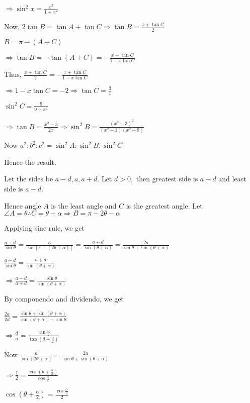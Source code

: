   $\Rightarrow \sin^2x = \frac{x^2}{1 + x^2}$

  Now, $2\tan B = \tan A + \tan C \Rightarrow \tan B = \frac{x + \tan C}{2}$

  $B = \pi - (A + C)$

  $\Rightarrow \tan B = -\tan(A + C) = -\frac{x + \tan C}{1 - x\tan C}$

  Thus, $\frac{x + \tan C}{2} = -\frac{x + \tan C}{1 - x\tan C}$

  $\Rightarrow 1 - x\tan C = -2 \Rightarrow \tan C = \frac{3}{x}$

  $\sin^2C = \frac{9}{9 + x^2}$

  $\Rightarrow \tan B = \frac{x^2 + 3}{2x} \Rightarrow \sin^2B = \frac{(x^2 + 3)^2}{(x^2 + 1)(x^2 + 9)}$

  Now $a^2:b^2:c^2 = \sin^2A:\sin^2B:\sin^2C$

  Hence the result.

\item Let the sides be $a - d, a, a + d.$ Let $d > 0,$ then greatest side is $a + d$ and least side is $a -
  d.$

  Hence angle $A$ is the least angle and $C$ is the greatest angle. Let $\angle A = \theta \therefore C =
  \theta + \alpha \Rightarrow B = \pi - 2\theta - \alpha$

  Applying sine rule, we get

  $\frac{a - d}{\sin\theta} = \frac{a}{\sin[\pi - (2\theta + \alpha)]} = \frac{a + d}{\sin(\theta + \alpha)} =
  \frac{2a}{\sin\theta + \sin(\theta + \alpha)}$

  $\frac{a - d}{\sin\theta} = \frac{a + d}{\sin(\theta + \alpha)}$

  $\Rightarrow \frac{a - d}{a + d} = \frac{\sin\theta}{\sin(\theta + \alpha)}$

  By componendo and dividendo, we get

  $\frac{2a}{2d} = \frac{\sin\theta + \sin(\theta + \alpha)}{\sin(\theta + \alpha) - \sin\theta}$

  $\Rightarrow \frac{d}{a} = \frac{\tan\frac{\alpha}{2}}{\tan\left(\theta + \frac{\alpha}{2}\right)}$

  Now $\frac{a}{\sin(2\theta + \alpha)} = \frac{2a}{\sin\theta + \sin(\theta + \alpha)}$

  $\Rightarrow \frac{1}{2} = \frac{\cos\left(\theta + \frac{\alpha}{2}\right)}{\cos\frac{\alpha}{2}}$

  $\cos\left(\theta + \frac{\alpha}{2}\right) = \frac{\cos\frac{\alpha}{2}}{2}$

